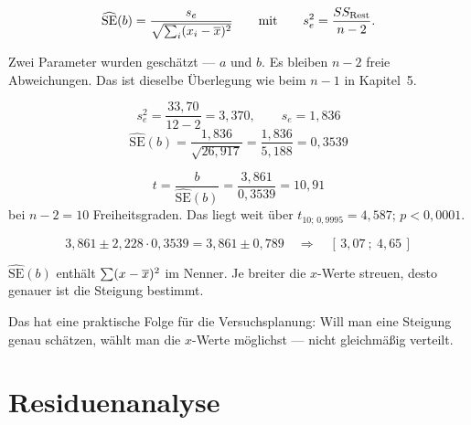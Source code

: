 \begin{merksatz}
\[ \widehat{\mathrm{SE}}(b) = \frac{s_e}{\sqrt{\sum_i (x_i-\overline{x})^2}} \qquad\text{mit}\qquad s_e^2 = \frac{SS_{\text{Rest}}}{n-2} . \]

Zwei Parameter wurden geschätzt --- $a$ und $b$. Es bleiben $n-2$ freie Abweichungen. Das ist dieselbe Überlegung wie beim $n-1$ in Kapitel~5.

\[ s_e^2 = \frac{33{,}70}{12-2} = 3{,}370, \qquad s_e = 1{,}836 \]
\[ \widehat{\mathrm{SE}}(b) = \frac{1{,}836}{\sqrt{26{,}917}} = \frac{1{,}836}{5{,}188} = 0{,}3539 \]

\[ t = \frac{b}{\widehat{\mathrm{SE}}(b)} = \frac{3{,}861}{0{,}3539} = 10{,}91 \]
bei $n-2 = 10$ Freiheitsgraden. Das liegt weit über $t_{10;\,0{,}9995} = 4{,}587$; $p < 0{,}0001$.

\[ 3{,}861 \pm 2{,}228 \cdot 0{,}3539 = 3{,}861 \pm 0{,}789 \quad\Longrightarrow\quad [\,3{,}07\ ;\ 4{,}65\,] \]

\begin{center}
\begin{minipage}{0.88\textwidth}
\end{minipage}
\end{center}

$\widehat{\mathrm{SE}}(b)$ enthält $\sum(x-\overline{x})^2$ im Nenner. Je breiter die $x$-Werte streuen, desto genauer ist die Steigung bestimmt.

Das hat eine praktische Folge für die Versuchsplanung: Will man eine Steigung genau schätzen, wählt man die $x$-Werte möglichst  --- nicht gleichmäßig verteilt.
\end{merksatz}

\section{Residuenanalyse}

